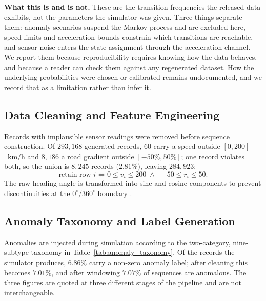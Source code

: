 \documentclass[journal]{IEEEtran}
\begin{document}
\textbf{What this is and is not.} These are the transition frequencies the
released data exhibits, not the parameters the simulator was given. Three
things separate them: anomaly scenarios suspend the Markov process and are
excluded here, speed limits and acceleration bounds constrain which
transitions are reachable, and sensor noise enters the state assignment
through the acceleration channel. We report them because reproducibility
requires knowing how the data behaves, and because a reader can check them
against any regenerated dataset. How the underlying probabilities were chosen
or calibrated remains undocumented, and we record that as a limitation rather
than infer it.

\subsection{Data Cleaning and Feature Engineering}
Records with implausible sensor readings were removed before sequence construction. Of $293{,}168$ generated records, $60$ carry a speed outside $[0,200]$~km/h and $8{,}186$ a road gradient outside $[-50\%,50\%]$; one record violates both, so the union is $8{,}245$ records ($2.81\%$), leaving $284{,}923$:
\begin{equation}
  \text{retain row }i \iff 0 \leq v_i \leq 200
  \;\land\; -50 \leq r_i \leq 50.
\end{equation}
The raw heading angle is transformed into sine and cosine components to prevent discontinuities at the $0^\circ/360^\circ$ boundary \cite{taheri_sarteshnizi_applicability_2026}.

\subsection{Anomaly Taxonomy and Label Generation}
Anomalies are injected during simulation according to the two-category, nine-subtype taxonomy in Table~\ref{tab:anomaly_taxonomy}. Of the records the simulator produces, $6.86\%$ carry a non-zero anomaly label; after cleaning this becomes $7.01\%$, and after windowing $7.07\%$ of sequences are anomalous. The three figures are quoted at three different stages of the pipeline and are not interchangeable.
\end{document}
